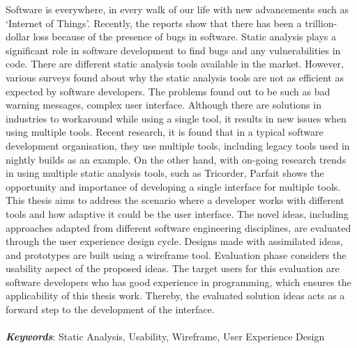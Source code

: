 Software is everywhere, in every walk of our life with new advancements such as ‘Internet of Things’. Recently, the reports show that there has been a trillion-dollar loss because of the presence of bugs in software. Static analysis plays a significant role in software development to find bugs and any vulnerabilities in code. There are different static analysis tools available in the market. However, various surveys found about why the static analysis tools are not as efficient as expected by software developers. The problems found out to be such as bad warning messages, complex user interface. Although there are solutions in industries to workaround while using a single tool, it results in new issues when using multiple tools. Recent research, it is found that in a typical software development organisation, they use multiple tools, including legacy tools used in nightly builds as an example.
On the other hand, with on-going research trends in using multiple static analysis tools, such as Tricorder, Parfait shows the opportunity and importance of developing a single interface for multiple tools. This thesis aims to address the scenario where a developer works with different tools and how adaptive it could be the user interface. The novel ideas, including approaches adapted from different software engineering disciplines, are evaluated through the user experience design cycle. Designs made with assimilated ideas, and prototypes are built using a wireframe tool. Evaluation phase considers the usability aspect of the proposed ideas. The target users for this evaluation are software developers who has good experience in programming, which ensures the applicability of this thesis work. Thereby, the evaluated solution ideas acts as a forward step to the development of the interface. \\ \\
\textbf{\textit{Keywords}}: Static Analysis, Usability, Wireframe, User Experience Design
